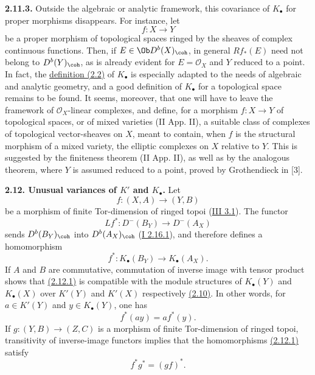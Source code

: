 \textbf{2.11.3.} Outside the algebraic or analytic framework, this covariance of \(K_{\bullet}\) for proper morphisms disappears. For instance, let
\[
 f:X\to Y
\]
be a proper morphism of topological spaces ringed by the sheaves of complex continuous functions. Then, if \(E\in\Ob D^b(X)_{\coh}\), in general \(Rf_*(E)\) need not belong to \(D^b(Y)_{\coh}\), as is already evident for \(E=\mathcal O_X\) and \(Y\) reduced to a point. In fact, the \hyperlink{sga6.e04.def.2-2}{definition (2.2)} of \(K_{\bullet}\) is especially adapted to the needs of algebraic and analytic geometry, and a good definition of \(K_{\bullet}\) for a topological space remains to be found. It seems, moreover, that one will have to leave the framework of \(\mathcal O_X\)-linear complexes, and define, for a morphism \(f:X\to Y\) of topological spaces, or of mixed varieties (II App. II), a suitable class of complexes of topological vector-sheaves on \(X\), meant to contain, when \(f\) is the structural morphism of a mixed variety, the elliptic complexes on \(X\) relative to \(Y\). This is suggested by the finiteness theorem (II App. II), as well as by the analogous theorem, where \(Y\) is assumed reduced to a point, proved by Grothendieck in [3].

\textbf{2.12. Unusual variances of \(K'\) and \(K_{\bullet}\).} Let
\[
 f:(X,A)\longrightarrow(Y,B)
\]
be a morphism of finite Tor-dimension of ringed topoi (\hyperlink{sga6.e03.def.3-1}{III 3.1}). The functor
\[
 Lf^*:D^-(B_Y)\longrightarrow D^-(A_X)
\]
sends \(D^b(B_Y)_{\coh}\) into \(D^b(A_X)_{\coh}\) (\hyperlink{sga6.e01.cor.2-16-1}{I 2.16.1}), and therefore defines a homomorphism
\begin{equation}\tag{2.12.1}
 f^*:K_{\bullet}(B_Y)\longrightarrow K_{\bullet}(A_X).
\end{equation}
If \(A\) and \(B\) are commutative, commutation of inverse image with tensor product shows that \hyperlink{sga6.e04.eq.2-12-1}{(2.12.1)} is compatible with the module structures of \(K_{\bullet}(Y)\) and \(K_{\bullet}(X)\) over \(K'(Y)\) and \(K'(X)\) respectively \hyperlink{sga6.e04.para.2-10}{(2.10)}. In other words, for \(a\in K'(Y)\) and \(y\in K_{\bullet}(Y)\), one has
\begin{equation}\tag{2.12.2}
 f^*(ay)=a f^*(y).
\end{equation}
If \(g:(Y,B)\to(Z,C)\) is a morphism of finite Tor-dimension of ringed topoi, transitivity of inverse-image functors implies that the homomorphisms \hyperlink{sga6.e04.eq.2-12-1}{(2.12.1)} satisfy
\begin{equation}\tag{2.12.1.1}
 f^*g^*=(gf)^*.
\end{equation}

